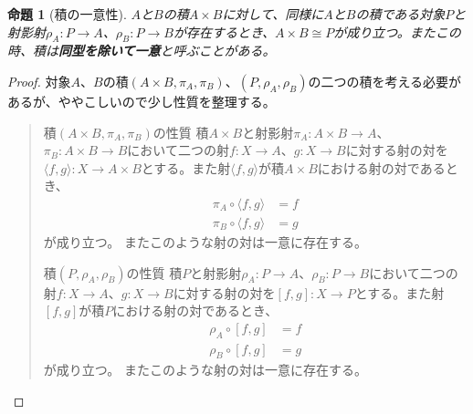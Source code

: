 \documentclass[uplatex,dvipdfmx]{jsarticle}
\newcommand{\arrow}{\rightarrow}
\newcommand{\tuple}[1]{\langle #1\rangle}
\newcommand{\mor}[3]{#1:#2\arrow #3}
\newtheorem{proof}{証明}[section]
\newtheorem{prop}[proof]{命題}
\numberwithin{proof}{subsection}
\newenvironment{mydescription}
{\begin{description}
  \setlength{\parskip}{0.5cm}
}
{\end{description}}
\begin{document}
	\begin{prop}[積の一意性]
		$A$と$B$の積$A\times B$に対して、同様に$A$と$B$の積である対象$P$と射影射$\mor{\rho_A}{P}{A}$、$\mor{\rho_B}{P}{B}$が存在するとき、$A\times B\cong P$が成り立つ。またこの時、積は\textbf{同型を除いて一意}と呼ぶことがある。
	\end{prop}
	\begin{proof}
		対象$A$、$B$の積$(A\times B,\pi_A,\pi_B)$、$(P,\rho_A,\rho_B)$の二つの積を考える必要があるが、ややこしいので少し性質を整理する。
		\begin{quote}
			\begin{mydescription}
				\item[積$(A\times B,\pi_A,\pi_B)$の性質]
				積$A\times B$と射影射$\mor{\pi_A}{A\times B}{A}$、$\mor{\pi_B}{A\times B}{B}$において二つの射$\mor{f}{X}{A}$、$\mor{g}{X}{B}$に対する射の対を$\mor{\tuple{f,g}}{X}{A\times B}$とする。また射$\tuple{f,g}$が積$A\times B$における射の対であるとき、
				\begin{align*}
					\pi_A\circ\tuple{f,g}&=f\\
					\pi_B\circ\tuple{f,g}&=g
				\end{align*}
				が成り立つ。
				またこのような射の対は一意に存在する。
				\begin{center}
				\end{center}
				\item[積$(P,\rho_A,\rho_B)$の性質]
				積$P$と射影射$\mor{\rho_A}{P}{A}$、$\mor{\rho_B}{P}{B}$において二つの射$\mor{f}{X}{A}$、$\mor{g}{X}{B}$に対する射の対を$\mor{[f,g]}{X}{P}$とする。また射$[f,g]$が積$P$における射の対であるとき、
				\begin{align*}
					\rho_A\circ[f,g]&=f\\
					\rho_B\circ[f,g]&=g
				\end{align*}
				が成り立つ。
				またこのような射の対は一意に存在する。
				\begin{center}
				\end{center}
			\end{mydescription}


\end{quote}
\end{proof}
\end{document}
